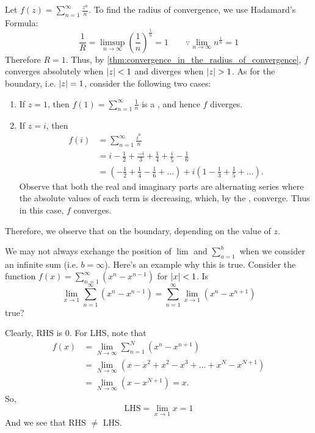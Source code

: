 \documentclass[11pt, oneside]{book}
\begin{document}
\begin{eg}
	Let $f(z) = \sum_{n=1}^{\infty} \frac{z^n}{n}$. To find the radius of convergence, we use Hadamard's Formula:
	\begin{equation*}
		\frac{1}{R} = \limsup_{n \to \infty} \left(\frac{1}{n} \right)^\frac{1}{n} = 1 \qquad \because \lim_{n \to \infty} n^\frac{1}{n} = 1
	\end{equation*}
	Therefore $R = 1$. Thus, by \cref{thm:convergence_in_the_radius_of_convergence}, $f$ converges absolutely when $\left|z\right| < 1$ and diverges when $\left|z\right| > 1$. As for the boundary, i.e. $\left|z\right| = 1$, consider the following two cases:
	\begin{enumerate}
		\item If $z = 1$, then $f(1) = \sum_{n=1}^{\infty} \frac{1}{n}$ is a , and hence $f$ diverges.
		\item If $z = i$, then
		\begin{align*}
			f(i) &= \sum_{n=1}^{\infty} \frac{i^n}{n} \\
				 &= i - \frac{1}{2} + \frac{-i}{3} + \frac{1}{4} + \frac{i}{5} - \frac{1}{6} \\
				 &= \left(-\frac{1}{2} + \frac{1}{4} - \frac{1}{6} + \hdots	\right) + i \left(1 - \frac{1}{3} + \frac{1}{5} + \hdots \right).
		\end{align*}
		Observe that both the real and imaginary parts are alternating series where the absolute values of each term is decreasing, which, by the , converge. Thus in this case, $f$ converges.
	\end{enumerate}
	Therefore, we observe that  on the boundary, depending on the value of $z$.
\end{eg}

\begin{note}
	We may not always exchange the position of $\lim$ and $\sum_{a=1}^{b}$ when we consider an infinite sum (i.e. $b = \infty$). Here's an example why this is true. Consider the function $f(x) = \sum_{n=1}^{\infty} (x^n - x^{n - 1})$ for $\left|x\right| < 1$. Is
	\begin{equation*}
		\lim_{x \to 1} \sum_{n=1}^{\infty} (x^n - x^{n - 1}) = \sum_{n=1}^{\infty} \lim_{x \to 1} (x^n - x^{n + 1})
	\end{equation*}
	true?

	Clearly, RHS is 0. For LHS, note that
	\begin{align*}
		f(x) &= \lim_{N \to \infty} \sum_{n=1}^{N} (x^n - x^{n + 1}) \\
			&= \lim_{N \to \infty} (x - x^2 + x^2 - x^3 + \hdots + x^N - x^{N + 1}) \\
			&= \lim_{N \to \infty} (x - x^{N + 1}) = x.
	\end{align*}
	So,
	\begin{equation*}
		\text{LHS} = \lim_{x \to 1} x = 1
	\end{equation*}
	And we see that RHS $\neq$ LHS.
\end{note}
\end{document}
